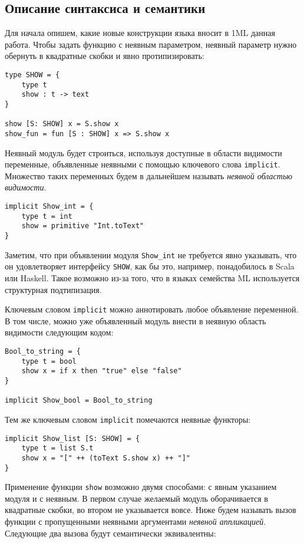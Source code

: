 \documentclass[../diploma.tex]{subfiles}
\begin{document}
\label{sec:1}

\subsection{Описание синтаксиса и семантики}

Для начала опишем, какие новые конструкции языка вносит в 1ML данная работа. Чтобы задать функцию с неявным параметром, неявный параметр нужно обернуть в квадратные скобки и явно протипизировать:

\begin{verbatim}
type SHOW = {
    type t
    show : t -> text
}

show [S: SHOW] x = S.show x
show_fun = fun [S : SHOW] x => S.show x
\end{verbatim}

Неявный модуль будет строиться, используя доступные в области видимости переменные, объявленные неявными с помощью ключевого слова \texttt{implicit}. Множество таких переменных будем в дальнейшем называть \textit{неявной областью видимости}.

\begin{verbatim}
implicit Show_int = {
    type t = int
    show = primitive "Int.toText"
}
\end{verbatim}

Заметим, что при объявлении модуля \texttt{Show\_int} не требуется явно указывать, что он удовлетворяет интерфейсу \texttt{SHOW}, как бы это, например, понадобилось в Scala или Haskell. Такое возможно из-за того, что в языках семейства ML используется структурная подтипизация.

Ключевым словом \texttt{implicit} можно аннотировать любое объявление переменной. В том числе, можно уже объявленный модуль внести в неявную область видимости следующим кодом:

\begin{verbatim}
Bool_to_string = {
    type t = bool
    show x = if x then "true" else "false"
}

implicit Show_bool = Bool_to_string
\end{verbatim}

Тем же ключевым словом \texttt{implicit} помечаются неявные функторы:

\begin{verbatim}
implicit Show_list [S: SHOW] = {
    type t = list S.t
    show x = "[" ++ (toText S.show x) ++ "]"
}
\end{verbatim}

Применение функции \texttt{show} возможно двумя способами: с явным указанием модуля и с неявным. В первом случае желаемый модуль оборачивается в квадратные скобки, во втором не указывается вовсе. Ниже будем называть вызов функции с пропущенными неявными аргументами \textit{неявной аппликацией}. Следующие два вызова будут семантически эквивалентны:
\end{document}

